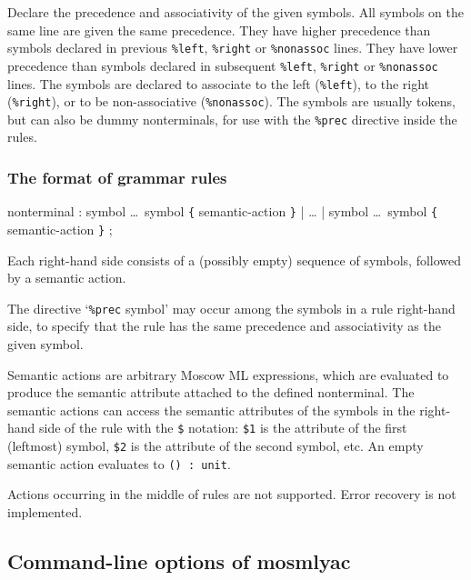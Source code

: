\documentclass[fleqn,a4paper]{article}
\begin{document}
\begin{description}
  Declare the precedence and associativity of the given symbols.  All
  symbols on the same line are given the same precedence.  They have
  higher precedence than symbols declared in previous {\tt \%left},
  {\tt \%right} or {\tt \%nonassoc} lines.  They have lower precedence
  than symbols declared in subsequent {\tt \%left}, {\tt \%right} or
  {\tt \%nonassoc} lines.  The symbols are declared to associate to
  the left ({\tt \%left}), to the right ({\tt \%right}), or to be
  non-associative ({\tt \%nonassoc}).  The symbols are usually tokens,
  but can also be dummy nonterminals, for use with the {\tt \%prec}
  directive inside the rules.
\end{description}


\subsubsection{The format of grammar rules}

\begin{program}
{\rm nonterminal} :
    {\rm symbol \ldots\ symbol} \verb#{# {\rm semantic-action} \verb#}#
  | \ldots
  | {\rm symbol \ldots\ symbol} \verb#{# {\rm semantic-action} \verb#}#
;
\end{program}

\noindent Each right-hand side consists of a (possibly empty) sequence
of symbols, followed by a semantic action.  

The directive `{\tt \%prec} symbol' may occur among the symbols in a
rule right-hand side, to specify that the rule has the same precedence
and associativity as the given symbol.

Semantic actions are arbitrary Moscow ML expressions, which are
evaluated to produce the semantic attribute attached to the defined
nonterminal.  The semantic actions can access the semantic attributes
of the symbols in the right-hand side of the rule with the \verb#$#
notation: \verb#$1# is the attribute of the first (leftmost) symbol,
\verb#$2# is the attribute of the second symbol, etc.  An empty
semantic action evaluates to {\tt () :\ unit}.

Actions occurring in the middle of rules are not supported.  Error
recovery is not implemented.


\subsection{Command-line options of mosmlyac}
\label{sec-mosmlyac-options}
\end{document}
